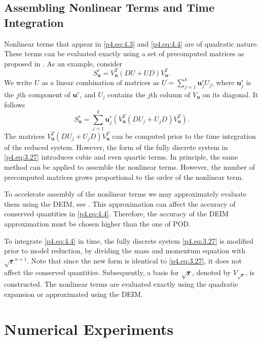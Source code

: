 \subsection{Assembling Nonlinear Terms and Time Integration}
Nonlinear terms that appear in \eqref{p4.eq:4.3} and \eqref{p4.eq:4.4} are of quadratic nature. These terms can be evaluated exactly using a set of precomputed matrices as proposed in \cite{Benner2018}. As an example, consider
\begin{equation}
	S_{\mathbf u}^r = V^T_{\mathbf u} ( DU + UD ) V^T_{\mathbf u}.
\end{equation}
We write $U$ as a linear combination of matrices as $U = \sum_{j=1}^k \mathbf u ^r_j U_j$, where $\mathbf u ^r_j$ is the $j$th component of $\mathbf u ^r$, and $U_j$ contains the $j$th column of $V_{\mathbf u}$ on its diagonal. It follows
\begin{equation}
	S_{\mathbf u}^r = \sum_{j=1}^k \mathbf u ^r_j \left( V^T_{\mathbf u} ( DU_j + U_jD ) V^T_{\mathbf u} \right).
\end{equation}
The matrices $V^T_{\mathbf u} ( DU_j + U_jD ) V^T_{\mathbf u}$ can be computed prior to the time integration of the reduced system. However, the form of the fully discrete system in \eqref{p4.eq:3.27} introduces cubic and even quartic terms. In principle, the same method can be applied to assemble the nonlinear terms. However, the number of precomputed matrices grows proportional to the order of the nonlinear term. 

To accelerate assembly of the nonlinear terms we may approximately evaluate them using the DEIM, see . This approximation can affect the accuracy of conserved quantities in \eqref{p4.eq:4.4}. Therefore, the accuracy of the DEIM approximation must be chosen higher than the one of POD.

To integrate \eqref{p4.eq:4.4} in time, the fully discrete system \eqref{p4.eq:3.27} is modified prior to model reduction, by dividing the mass and momentum equation with $\sqrt{\mathbf r}^{n+1}$. Note that since the new form is identical to \eqref{p4.eq:3.27}, it does not affect the conserved quantities. Subsequently, a basis for $\sqrt{\mathbf r}$, denoted by $V_{\sqrt{\mathbf r}}$, is constructed. The nonlinear terms are evaluated exactly using the quadratic expansion or approximated using the DEIM.

\section{Numerical Experiments} \label{p4.sec:res}


